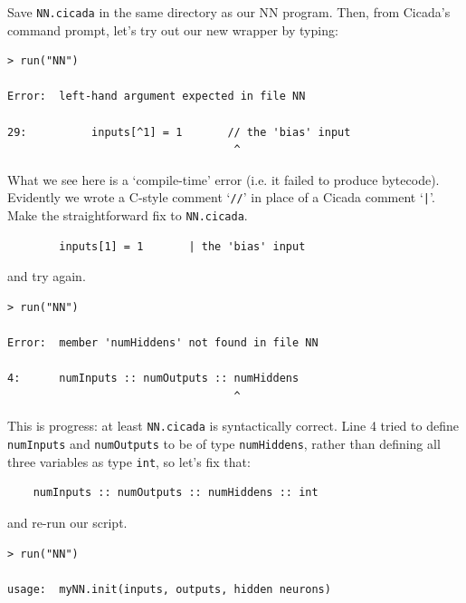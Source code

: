 \documentclass{article}
\newenvironment{code}{
       \begin{list}{}{
               \setlength{\leftmargin}{.4in}
               \setlength{\rightmargin}{0in}
               \setlength{\topsep}{.2in}
       }
       \small
       \item[] }
       { \end{list}   }
\begin{document}
\noindent Save \verb#NN.cicada# in the same directory as our NN program.  Then, from Cicada's command prompt, let's try out our new wrapper by typing:

\begin{code} \begin{verbatim}
> run("NN")

Error:  left-hand argument expected in file NN

29:          inputs[^1] = 1       // the 'bias' input
                                   ^
\end{verbatim} \end{code}

What we see here is a `compile-time' error (i.e. it failed to produce bytecode).  Evidently we wrote a C-style comment `\verb#//#' in place of a Cicada comment `\verb#|#'.  Make the straightforward fix to \verb#NN.cicada#.

\begin{code} \begin{verbatim}
        inputs[1] = 1       | the 'bias' input
\end{verbatim} \end{code}

\noindent and try again.

\begin{code} \begin{verbatim}
> run("NN")

Error:  member 'numHiddens' not found in file NN

4:      numInputs :: numOutputs :: numHiddens
                                   ^
\end{verbatim} \end{code}

\noindent This is progress: at least \verb#NN.cicada# is syntactically correct.  Line 4 tried to define \verb#numInputs# and \verb#numOutputs# to be of type \verb#numHiddens#, rather than defining all three variables as type \verb#int#, so let's fix that:

\begin{code} \begin{verbatim}
    numInputs :: numOutputs :: numHiddens :: int
\end{verbatim} \end{code}

\noindent and re-run our script.

\begin{code} \begin{verbatim}
> run("NN")

usage:  myNN.init(inputs, outputs, hidden neurons)
\end{verbatim} \end{code}
\end{document}

